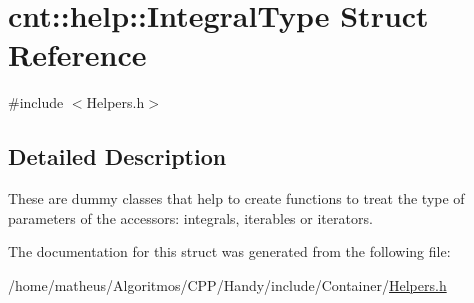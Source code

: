 \hypertarget{structcnt_1_1help_1_1IntegralType}{}\section{cnt\+:\+:help\+:\+:Integral\+Type Struct Reference}
\label{structcnt_1_1help_1_1IntegralType}


{\ttfamily \#include $<$Helpers.\+h$>$}



\subsection{Detailed Description}
These are dummy classes that help to create functions to treat the type of parameters of the accessors\+: integrals, iterables or iterators. 

The documentation for this struct was generated from the following file\+:\begin{DoxyCompactItemize}
\item 
/home/matheus/\+Algoritmos/\+C\+P\+P/\+Handy/include/\+Container/\hyperlink{Container_2Helpers_8h}{Helpers.\+h}\end{DoxyCompactItemize}
